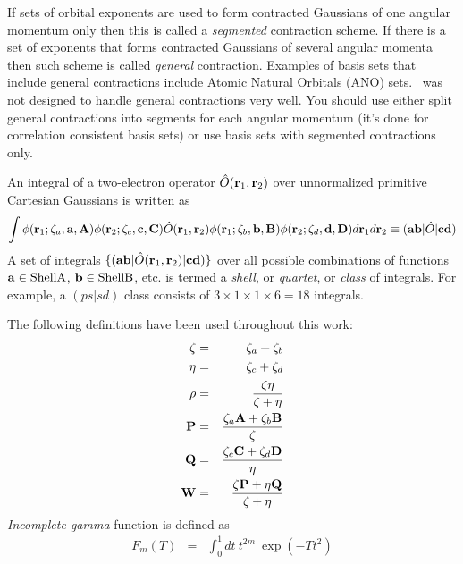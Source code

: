 \documentclass[12pt]{article}
\begin{document}
If sets of orbital exponents are used to form contracted Gaussians of one angular momentum only
then this is called a {\em segmented} contraction scheme. If there is a set of exponents that forms
contracted Gaussians of several angular momenta then such scheme is called {\em general} contraction.
Examples of basis sets that include general contractions include Atomic Natural Orbitals (ANO) sets.
\LIBINT\ was not designed to handle general contractions very well. You should use either split general contractions
into segments for each angular momentum (it's done for correlation consistent basis sets)
or use basis sets with segmented contractions only.

An integral of a two-electron operator $\hat{O}({\bf r}_1, {\bf r}_2)$ over unnormalized
primitive Cartesian Gaussians is written as
\begin{eqnarray}
\int \phi({\bf r}_1; \zeta_a, {\bf a}, {\bf A}) \phi ({\bf r}_2; \zeta_c, {\bf c}, {\bf C}) \hat{O}({\bf r}_1, {\bf r}_2)
\phi({\bf r}_1; \zeta_b, {\bf b}, {\bf B}) \phi({\bf r}_2; \zeta_d, {\bf d}, {\bf D}) d{\bf r}_1 d{\bf r}_2 \equiv ({\bf ab} |\hat{O}|{\bf cd})
\end{eqnarray}
A set of integrals $\{ ({\bf a} {\bf b}|\hat{O}({\bf r}_1, {\bf r}_2)|{\bf c} {\bf d}) \}$
over all possible combinations of functions ${\bf a} \in {\rm Shell A}$, ${\bf b} \in {\rm Shell B}$, etc.
is termed a {\em shell}, or {\em quartet}, or {\em class} of integrals. For example, a $(ps|sd)$ class consists of
$3 \times 1 \times 1 \times 6 = 18$ integrals.

The following definitions have been used throughout this work:
\begin{eqnarray}
\zeta & = & \zeta_a + \zeta_b \\
\eta  & = & \zeta_c + \zeta_d \\
\rho  & = & \frac{\zeta\eta}{\zeta+\eta} \\
{\bf P}& = & \frac{\zeta_a {\bf A} + \zeta_b {\bf B}}{\zeta} \\
{\bf Q}& = & \frac{\zeta_c {\bf C} + \zeta_d {\bf D}}{\eta} \\
{\bf W}& = & \frac{\zeta {\bf P} + \eta {\bf Q}}{\zeta+\eta}
\end{eqnarray}
{\em Incomplete gamma} function is defined as
\begin{eqnarray}
F_m(T) & = & \int_0^{1} dt\ t^{2m}\ \exp (-Tt^2)
\end{eqnarray}
\end{document}
